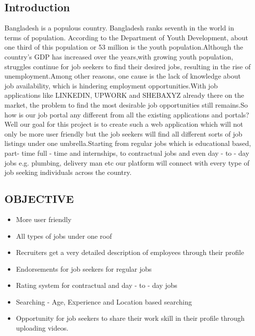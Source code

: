 \documentclass{article}
\begin{document}
\subsection{{Introduction}}
Bangladesh is a populous country. Bangladesh ranks seventh in the world in terms of population. According to the 
Department of Youth Development, about one third of this population or 53 million is the youth population.Although the 
country’s GDP has increased over the years,with growing youth population, struggles continue for job seekers to find their 
desired jobs, resulting in the rise of unemployment.Among other reasons, one cause is the lack of knowledge about job 
availability, which is hindering employment opportunities.With job applications like LINKEDIN, UPWORK and SHEBAXYZ 
already there on the market, the problem to find the most desirable job opportunities still remains.So how is our job portal 
any different from all the existing applications and portals? Well our goal for this project is to create such a web application 
which will not only be more user friendly but the job seekers will find all different sorts of job listings under one 
umbrella.Starting from regular jobs which is educational based, part- time full - time and internships, to contractual jobs and 
even day - to - day jobs e.g. plumbing, delivery man etc our platform will connect with every type of job seeking individuals 
across the country.
      
\subsection{ \textbf{  OBJECTIVE }}
 
\begin{itemize}
\item More user friendly 
\end{itemize}
             
\begin{itemize}
\item All types of jobs under one roof
\end{itemize}
\begin{itemize}
\item Recruiters get a very detailed description of employees through their profile
\item Endorsements for job seekers for regular jobs
\item Rating system for contractual and day - to - day jobs 
\item Searching - Age, Experience and Location based searching
\item Opportunity for job seekers to share their work skill in their profile through uploading videos.
\end{itemize}
\end{document}
